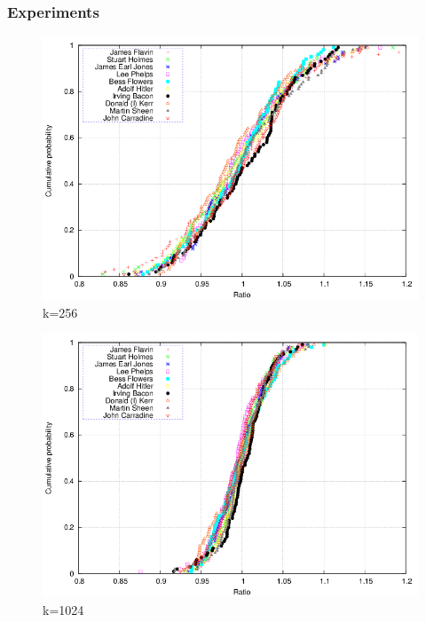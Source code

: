 \documentclass[a4paper,11pt]{article}
\begin{document}
\subsubsection{Experiments}
\begin{figure}[h!]
\centering \includegraphics[width=1\textwidth]{plot256.png}
\caption{k=256}
\label{fig:exp256}
\end{figure}
\begin{figure}[h!]
\centering \includegraphics[width=1\textwidth]{plot1024.png}
\caption{k=1024}
\label{fig:exp1024}
\end{figure}
\end{document}
